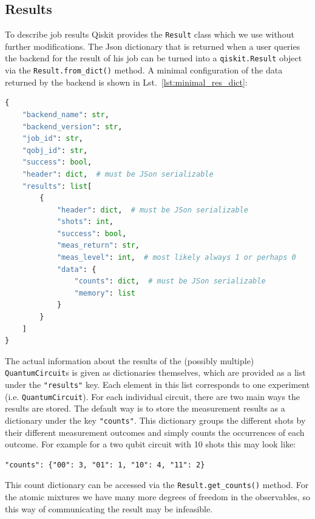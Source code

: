 \documentclass[a4paper, 10pt]{article}
\newcommand{\co}[1]{\texttt{#1}}
\begin{document}
\subsection{Results} \label{sec:design_results}

To describe job results Qiskit provides the \co{Result} class which we use without further modifications.
The Json dictionary that is returned when a user queries the backend for the result of his job can be turned into a \co{qiskit.Result} object via the \co{Result.from\_dict()} method.
A minimal configuration of the data returned by the backend is shown in Lst.~\ref{lst:minimal_res_dict}:

\begin{lstlisting}[language=Python, caption = configuration of result dictionary returned by the backend as a Json dictionary, label = {lst:minimal_res_dict}]
{
    "backend_name": str,
    "backend_version": str,
    "job_id": str,
    "qobj_id": str,
    "success": bool,
    "header": dict,  # must be JSon serializable
    "results": list[
        {   
            "header": dict,  # must be JSon serializable
            "shots": int,
            "success": bool,
            "meas_return": str,
            "meas_level": int,  # most likely always 1 or perhaps 0
            "data": {
                "counts": dict,  # must be JSon serializable
                "memory": list 
            }
        }
    ]
}
\end{lstlisting}

The actual information about the results of the (possibly multiple) \co{QuantumCircuit}s is given as dictionaries themselves, which are provided as a list under the \co{"results"} key. Each element in this list corresponds to one experiment (i.e. \co{QuantumCircuit}).
For each individual circuit, there are two main ways the results are stored.
The default way is to store the measurement results as a dictionary under the key \co{"counts"}.
This dictionary groups the different shots by their different measurement outcomes and simply counts the occurrences of each outcome.
For example for a two qubit circuit with 10 shots this may look like:
\begin{lstlisting}
"counts": {"00": 3, "01": 1, "10": 4, "11": 2}
\end{lstlisting}
This count dictionary can be accessed via the \co{Result.get\_counts()} method.
For the atomic mixtures we have many more degrees of freedom in the observables, so this way of communicating the result may be infeasible.
\end{document}
